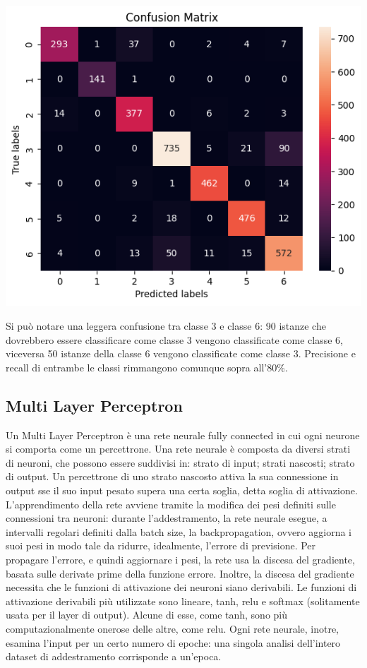 \begin{Figure}
    \centering
    \includegraphics[width=\linewidth]{img/tree_confusion_matrix.png}
\end{Figure}

Si può notare una leggera confusione tra classe 3 e classe 6: 90 istanze che 
dovrebbero essere classificare come classe 3 vengono classificate come classe 6,
viceversa 50 istanze della classe 6 vengono classificate come classe 3.
Precisione e recall di entrambe le classi rimmangono comunque sopra all'$80\%$.

\subsection{Multi Layer Perceptron}
Un Multi Layer Perceptron è una rete neurale fully connected in cui 
ogni neurone si comporta come un percettrone. Una rete neurale è composta
da diversi strati di neuroni, che possono essere suddivisi in: strato di input;
strati nascosti; strato di output.
Un percettrone di uno strato nascosto attiva la sua connessione in output
sse il suo input pesato supera una certa soglia, detta soglia di attivazione.
L'apprendimento della rete avviene tramite la modifica dei pesi definiti
sulle connessioni tra neuroni: durante l'addestramento, la rete neurale esegue,
a intervalli regolari definiti dalla batch size, la backpropagation, ovvero
aggiorna i suoi pesi in modo tale da ridurre, idealmente, l'errore di previsione.
Per propagare l'errore, e quindi aggiornare i pesi, la rete usa la discesa del
gradiente, basata sulle derivate prime della funzione errore. Inoltre,
la discesa del gradiente necessita che le funzioni di attivazione dei neuroni
siano derivabili.
Le funzioni di attivazione derivabili più utilizzate sono lineare, tanh, relu
e softmax (solitamente usata per il layer di output). Alcune di esse, come tanh,
sono più computazionalmente onerose delle altre, come relu.
Ogni rete neurale, inotre, esamina l'input per un certo numero di epoche:
una singola analisi dell'intero dataset di addestramento corrisponde a un'epoca.

